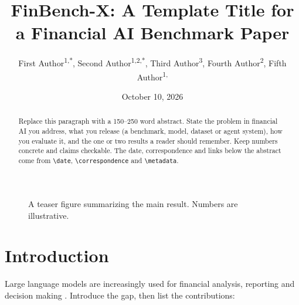 \documentclass[11pt]{article}
\title{FinBench-X: A Template Title for a Financial AI Benchmark Paper}
\date{October 10, 2026}
\author{%
  First Author\textsuperscript{1,*}, Second Author\textsuperscript{1,2,*}, Third Author\textsuperscript{3},
  Fourth Author\textsuperscript{2}, Fifth Author\textsuperscript{1,\dag}%
}
\affiliation[1]{The Fin AI}
\affiliation[2]{University One}
\affiliation[3]{Institute Two}
\begin{document}
\begin{abstract}
Replace this paragraph with a 150--250 word abstract. State the problem in financial AI you address, what you
release (a benchmark, model, dataset or agent system), how you evaluate it, and the one or two results a reader
should remember. Keep numbers concrete and claims checkable. The date, correspondence and links below the abstract
come from \texttt{\textbackslash date}, \texttt{\textbackslash correspondence} and \texttt{\textbackslash metadata}.
\end{abstract}

\maketitle

\begin{figure}[h]
  \centering
  \caption{A teaser figure summarizing the main result. Numbers are illustrative.}
  \label{fig:teaser}
\end{figure}

\section{Introduction}
Large language models are increasingly used for financial analysis, reporting and decision making
\citep{xie2023pixiu,xie2024finben}. Introduce the gap, then list the contributions:
\end{document}
